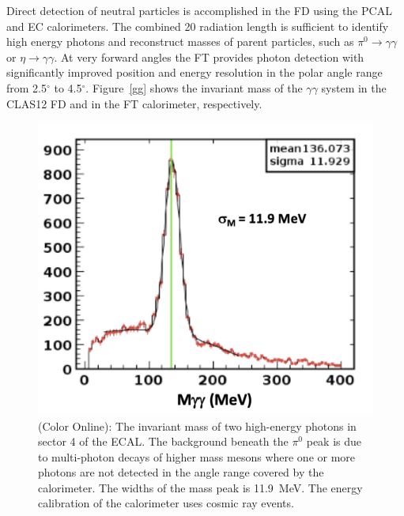 \documentclass[final,3p,twocolumn]{elsarticle}
\begin{document}
Direct detection of neutral particles is accomplished in the FD using the PCAL and EC calorimeters. The combined
20 radiation length is sufficient to identify high energy photons and reconstruct masses of parent particles, such
as $\pi^0\to \gamma \gamma$  or $\eta \to \gamma \gamma$. At very forward angles the FT provides photon
detection with significantly improved position and energy resolution in the polar angle range from 2.5$^\circ$ to
4.5$^\circ$. Figure~\ref{gg} shows the invariant mass of the $\gamma\gamma$ system in the CLAS12 FD and in
the FT calorimeter, respectively. 

\begin{figure}[htbp!]
\centerline{\includegraphics[width=0.95\columnwidth]{ECAL-2g-mass-fit.png}}
\caption{(Color Online): The invariant mass of two high-energy photons in sector 4 of the ECAL. The background beneath
the $\pi^0$ peak is due to multi-photon decays of higher mass mesons where one or more photons are not detected
in the angle range covered by the calorimeter. The widths of the mass peak is 11.9~MeV. The energy calibration of the calorimeter 
uses cosmic ray events. }

\end{figure}
\end{document}
